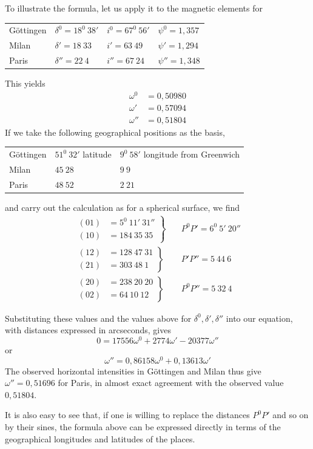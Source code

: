 To illustrate the formula, let us apply it to the magnetic elements for
\begin{center}
\begin{tabular}{l|l|l|l}
Göttingen&$\delta^0=18^0\ 38'$&$i^0=67^0\ 56'$&$\psi^0=1{,}357$\\
Milan&$\delta'=18\ 33$&$i'=63\ 49$&$\psi'=1{,}294$\\
Paris&$\delta''=22\ 4$&$i''=67\ 24$&$\psi''=1{,}348$
\end{tabular}
\end{center}
This yields
\[
\begin{aligned}
\omega^0&=0{,}50980\\
\omega'&=0{,}57094\\
\omega''&=0{,}51804
\end{aligned}
\]
If we take the following geographical positions as the basis,
\begin{center}
\begin{tabular}{l|l|l}
Göttingen&$51^0\ 32'$ latitude&$9^0\ 58'$ longitude from Greenwich\\
Milan&$45\ 28$&$9\ 9$\\
Paris&$48\ 52$&$2\ 21$
\end{tabular}
\end{center}
and carry out the calculation as for a spherical surface, we find
\[
\begin{aligned}
\left.\begin{aligned}(01)&=5^0\ 11'\ 31''\\(10)&=184\ 35\ 35\end{aligned}\right\}&\quad P^0P'=6^0\ 5'\ 20''\\[4pt]
\left.\begin{aligned}(12)&=128\ 47\ 31\\(21)&=303\ 48\ 1\end{aligned}\right\}&\quad P'P''=5\ 44\ 6\\[4pt]
\left.\begin{aligned}(20)&=238\ 20\ 20\\(02)&=64\ 10\ 12\end{aligned}\right\}&\quad P^0P''=5\ 32\ 4
\end{aligned}
\]
\par{}
Substituting these values and the values above for $\delta^0,\delta',\delta''$ into our equation, with distances expressed in arcseconds, gives
\[
0=17556\omega^0+2774\omega'-20377\omega''
\]
or
\[
\omega''=0{,}86158\omega^0+0{,}13613\omega'
\]
The observed horizontal intensities in Göttingen and Milan thus give $\omega''=0{,}51696$ for Paris, in almost exact agreement with the observed value $0{,}51804$.

It is also easy to see that, if one is willing to replace the distances $P^0P'$ and so on by their sines, the formula above can be expressed directly in terms of the geographical longitudes and latitudes of the places.

